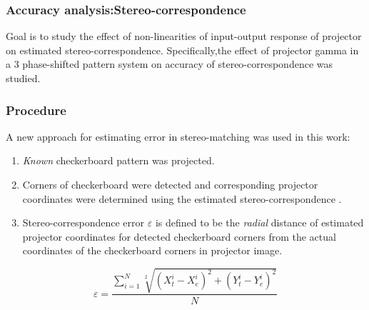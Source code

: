 \documentclass[9pt]{beamer}
\begin{document}
\begin{frame}
\frametitle{Accuracy analysis:Stereo-correspondence}
Goal is to study the effect of non-linearities of input-output response of projector on estimated stereo-correspondence.\newline
Specifically,the effect of projector gamma in a 3 phase-shifted pattern system on accuracy of stereo-correspondence was studied.
\end{frame}

\begin{frame}
\frametitle{Procedure}
A new approach for estimating error in stereo-matching was used in this work:
\begin{enumerate}
\item \textit{Known} checkerboard pattern was projected. 
\item Corners of checkerboard were detected and corresponding projector coordinates were determined using the estimated stereo-correspondence . 
\item Stereo-correspondence error $\varepsilon$ is defined to be the \textit{radial} distance of estimated projector coordinates for detected checkerboard corners from the actual coordinates of the checkerboard corners in projector image. 
\end{enumerate}

\begin{equation}
\varepsilon=\frac{\sum_{i=1}^N\sqrt[2]{(X_t^i-X_e^i)^2+(Y_t^i-Y_e^i)^2}}{N}
\end{equation}

\end{frame}
\end{document}
